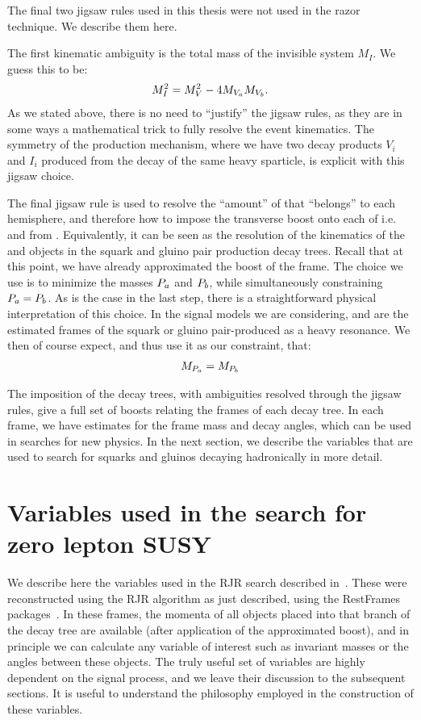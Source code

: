The final two jigsaw rules used in this thesis were not used in the razor technique.
We describe them here.

The first kinematic ambiguity is the total mass of the invisible system $M_I$.
We guess this to be:
\begin{align}
M_I^2 = M_V^2 - 4 M_{V_a} M_{V_b}.
\end{align}
As we stated above, there is no need to ``justify'' the jigsaw rules, as they are in some ways a mathematical trick to fully resolve the event kinematics.
The symmetry of the production mechanism, where we have two decay products $V_i$ and $I_i$ produced from the decay of the same heavy sparticle, is explicit with this jigsaw choice.

The final jigsaw rule is used to resolve the ``amount'' of \met that ``belongs'' to each hemisphere, and therefore how to impose the transverse boost onto each of i.e. \Pa and \Pb from \PP.
Equivalently, it can be seen as the resolution of the kinematics of the \Ia and \Ib objects in the squark and gluino pair production decay trees.
Recall that at this point, we have already approximated the boost of the \PP frame.
The choice we use is to minimize the masses $P_a$ and $P_b$, while simultaneously constraining $P_a = P_b$.
As is the case in the last step, there is a straightforward physical interpretation of this choice.
In the signal models we are considering, \Pa and \Pb are the estimated frames of the squark or gluino pair-produced as a heavy resonance.
We then of course expect, and thus use it as our constraint, that:
\begin{align}
M_{P_a} = M_{P_b}
\end{align}

The imposition of the decay trees, with ambiguities resolved through the jigsaw rules, give a full set of boosts relating the frames of each decay tree.
In each frame, we have estimates for the frame mass and decay angles, which can be used in searches for new physics.
In the next section, we describe the variables that are used to search for squarks and gluinos decaying hadronically in more detail.

\section{Variables used in the search for zero lepton SUSY}
\label{sec:rjr_hadronic}

We describe here the variables used in the RJR search described in~\cite{ATLAS-CONF-2016-078}.
These were reconstructed using the RJR algorithm as just described, using the RestFrames packages~\cite{RestFrames}.
In these frames, the momenta of all objects placed into that branch of the decay tree are available (after application of the approximated boost), and in principle we can calculate any variable of interest such as invariant masses or the angles between these objects.
The truly useful set of variables are highly dependent on the signal process, and we leave their discussion to the subsequent sections.
It is useful to understand the philosophy employed in the construction of these variables.

